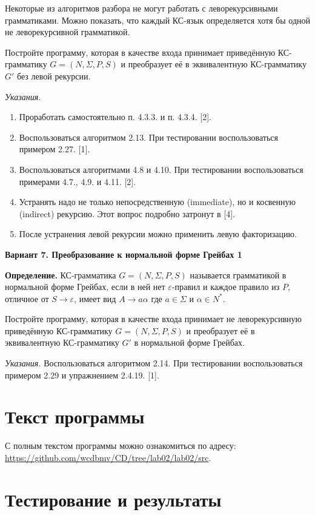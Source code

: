 \documentclass{bmstu-gost-7-32}
\begin{document}
Некоторые из алгоритмов разбора не могут работать с леворекурсивными грамматиками.
Можно показать, что каждый КС-язык определяется хотя бы одной не леворекурсивной грамматикой.

Постройте программу, которая в качестве входа принимает приведённую КС-грамматику $G = (N, \Sigma, P, S)$ и преобразует её в эквивалентную КС-грамматику $G'$ без левой рекурсии.

\textit{Указания.}
\begin{enumerate}
	\item Проработать самостоятельно п. 4.3.3. и п. 4.3.4. [2].
	\item Воспользоваться алгоритмом 2.13.
	При тестировании воспользоваться примером 2.27. [1].
	\item Воспользоваться алгоритмами 4.8 и 4.10.
	При тестировании воспользоваться примерами 4.7., 4.9. и 4.11. [2].
	\item Устранять надо не только непосредственную (immediate), но и косвенную (indirect) рекурсию.
	Этот вопрос подробно затронут в [4].
	\item После устранения левой рекурсии можно применить левую факторизацию.
\end{enumerate}

\textbf{Вариант 7. Преобразование к нормальной форме Грейбах 1}

\textbf{Определение.}
КС-грамматика $G = (N, \Sigma, P, S)$ называется грамматикой в нормальной форме Грейбах, если в ней нет $\varepsilon$-правил и каждое правило из $P$, отличное от $S \to \varepsilon$, имеет вид $A \to a\alpha$ где $a \in \Sigma$ и $\alpha \in N^*$.

Постройте программу, которая в качестве входа принимает не леворекурсивную приведённую КС-грамматику $G = (N, \Sigma, P, S)$ и преобразует её в эквивалентную КС-грамматику $G'$ в нормальной форме Грейбах.

\textit{Указания.}
Воспользоваться алгоритмом 2.14.
При тестировании воспользоваться примером 2.29 и упражнением 2.4.19. [1].

\section*{Текст программы}

С полным текстом программы можно ознакомиться по адресу: \url{https://github.com/wcdbmv/CD/tree/lab02/lab02/src}.

\section*{Тестирование и результаты}
\end{document}
